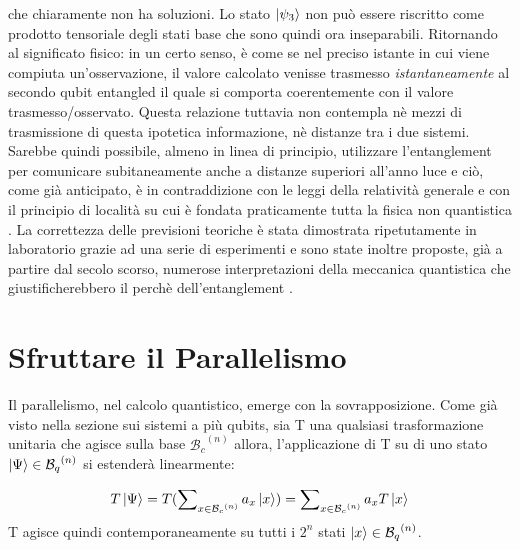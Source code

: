 \documentclass[12pt,a4paper,openright]{report}
\begin{document}
che chiaramente non ha soluzioni. Lo stato $\ket{\psi_3}$ non può essere riscritto come prodotto tensoriale degli stati base che sono quindi ora inseparabili.
Ritornando al significato fisico: in un certo senso, è come se nel preciso istante in cui viene compiuta un'osservazione, il valore calcolato venisse trasmesso \emph{istantaneamente} al secondo qubit entangled il quale si comporta coerentemente
con il valore trasmesso/osservato. Questa relazione tuttavia non contempla nè mezzi di trasmissione di questa ipotetica informazione, nè distanze tra i due sistemi. Sarebbe quindi possibile, almeno in linea di
principio, utilizzare l'entanglement per comunicare subitaneamente anche a distanze superiori all'anno luce e ciò, come già anticipato, è in contraddizione con le leggi della relatività generale e con il 
principio di località su cui è fondata praticamente tutta la fisica non quantistica \cite{ref9}. La correttezza delle previsioni teoriche è stata dimostrata ripetutamente in laboratorio grazie ad una serie
di esperimenti \cite{ref10} e sono state inoltre proposte, già a partire dal secolo scorso, numerose interpretazioni della meccanica quantistica che giustificherebbero il perchè dell'entanglement \cite{ref11}.

\section{Sfruttare il Parallelismo}

Il parallelismo, nel calcolo quantistico, emerge con la sovrapposizione. Come già visto nella sezione sui sistemi a più qubits, sia T una qualsiasi trasformazione unitaria che agisce sulla base ${\mathcal{B}_c}^{(n)}$
allora, l'applicazione di T su di uno stato $\ket{\Psi}\in{{\mathcal{B}_q}^{(n)}}$ si estenderà linearmente:

\[
    T\ket{\Psi} = T(\sum\nolimits_{x \in {\mathcal{B}_c}^{(n)}} a_x \ket{x}) = \sum\nolimits_{x \in {\mathcal{B}_c}^{(n)}} a_x T\ket{x}
\]
T agisce quindi contemporaneamente su tutti i $2^n$ stati $\ket{x}\in{{\mathcal{B}_q}^{(n)}}$.

\par
\end{document}
